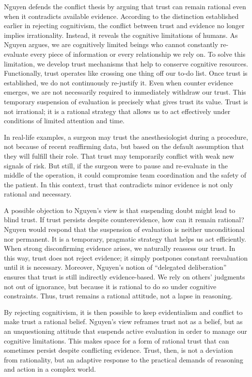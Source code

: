 Nguyen defends the conflict thesis by arguing that trust can remain rational even when it contradicts available evidence. According to the distinction established earlier in rejecting cognitivism, the conflict between trust and evidence no longer implies irrationality. Instead, it reveals the cognitive limitations of humans. As Nguyen argues, we are cognitively limited beings who cannot constantly re-evaluate every piece of information or every relationship we rely on. To solve this limitation, we develop trust mechanisms that help to conserve cognitive resources. Functionally, trust operates like crossing one thing off our to-do list. Once trust is established, we do not continuously re-justify it. Even when counter evidence emerges, we are not necessarily required to immediately withdraw our trust. This temporary suspension of evaluation is precisely what gives trust its value. Trust is not irrational; it is a rational strategy that allows us to act effectively under conditions of limited attention and time.

In real-life examples, a surgeon may trust the anesthesiologist during a procedure, not because of recent reaffirming data, but based on the default assumption that they will fulfill their role. That trust may temporarily conflict with weak new signals of risk. But still, if the surgeon were to pause and re-evaluate in the middle of the operation, it could compromise team coordination and the safety of the patient. In this context, trust that contradicts minor evidence is not only rational and necessary.

A possible objection to Nguyen’s view is that suspending doubt might lead to blind trust. If trust persists despite counterevidence, how can it remain rational? Nguyen would respond that the suspension of evaluation is neither unconditional nor permanent. It is a temporary, pragmatic strategy that helps us act efficiently. When strong disconfirming evidence arises, we naturally reassess our trust. In this way, trust does not reject evidence; it simply postpones constant reevaluation until it is necessary. Moreover, Nguyen’s notion of “delegated deliberation” ensures that trust is still indirectly evidence-based. We rely on others’ judgments not out of ignorance, but because it is rational to do so under cognitive constraints. Thus, trust remains a rational attitude, not a lapse in reasoning.

By rejecting cognitivism, it is then possible to keep evidentialism and conflict to make trust a rational belief. Nguyen’s view reframes trust not as a belief, but as an unquestioning attitude that suspends active evaluation in order to manage our cognitive limitations. This makes space for a form of rational trust that can sometimes persist despite conflicting evidence. Trust, then, is not a deviation from rationality, but an adaptive response to the practical demands of reasoning and action in a complex world.
